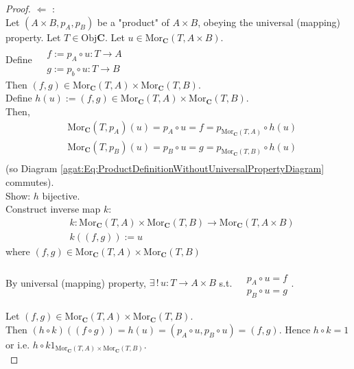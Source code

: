 \begin{proof}
$\Longleftarrow$ : \\

	Let $(A\times B, p_A, p_B)$ be a "product" of $A\times B$, obeying the universal (mapping) property. Let $T\in \text{Obj}\mathbf{C}$. Let $u\in \text{Mor}_{\mathbf{C}}(T, A\times B)$. \\
	
	Define $\begin{aligned} & \quad  \\
	& f:= p_A \circ u : T \to A \\ 
	& g:= p_b \circ u : T \to B\end{aligned}$  \\
	Then $(f,g) \in \text{Mor}_{\mathbf{C}}(T,A) \times \text{Mor}_{\mathbf{C}}(T,B)$. \\
	
	Define $h(u):= (f,g) \in \text{Mor}_{\mathbf{C}}(T,A) \times \text{Mor}_{\mathbf{C}}(T,B)$. \\
	Then, 
	\[
	\begin{aligned}
		& \text{Mor}_{\mathbf{C}}(T,p_A)(u) = p_A \circ u = f = p_{\text{Mor}_{\mathbf{C}}(T,A)} \circ h(u) \\	
		& \text{Mor}_{\mathbf{C}}(T,p_B)(u) = p_B \circ u = g = p_{\text{Mor}_{\mathbf{C}}(T,B)} \circ h(u) \\	
	\end{aligned}	
	\]
	(so Diagram \ref{agat:Eq:ProductDefinitionWithoutUniversalPropertyDiagram} commutes). \\
	
	Show: $h$ bijective. \\
	Construct inverse map $k$:
	\[
	\begin{aligned}
		& k : \text{Mor}_{\mathbf{C}}(T,A) \times \text{Mor}_{\mathbf{C}}(T,B) \to \text{Mor}_{\mathbf{C}}(T,A\times B) \\
		& k((f,g))  := u
	\end{aligned}
	\]
	where $(f,g) \in \text{Mor}_{\mathbf{C}}(T,A) \times \text{Mor}_{\mathbf{C}}(T,B)$
	
	By universal (mapping) property, $\exists \, ! \, u :T\to A\times B$ s.t. $\begin{aligned} & \quad \\ 
	& p_A \circ u=f \\
	& p_B \circ u = g \end{aligned}$.
	
	Let $(f,g) \in \text{Mor}_{\mathbf{C}}(T,A) \times \text{Mor}_{\mathbf{C}}(T,B)$. \\
	Then $(h\circ k)((f\circ g)) = h(u) = (p_A\circ u, p_B \circ u) = (f,g)$. Hence $h\circ k =1$ or i.e. $h\circ k 1_{\text{Mor}_{\mathbf{C}}(T,A) \times \text{Mor}_{\mathbf{C}}(T,B)}$. \\
	

\end{proof}
